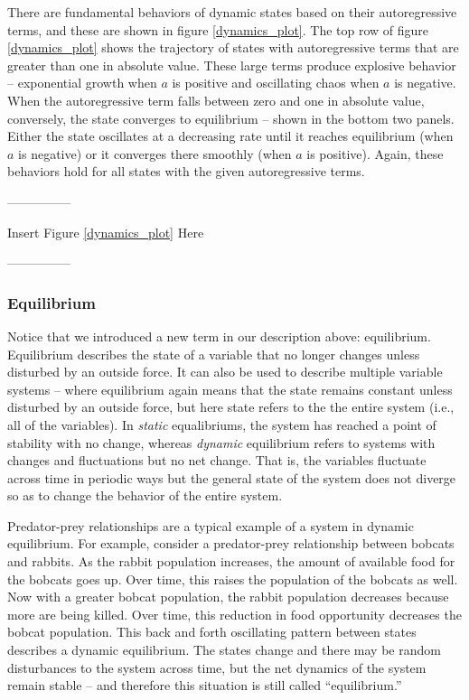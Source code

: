 \documentclass[english,,man]{apa6}
\theoremstyle{definition}
\theoremstyle{definition}
\theoremstyle{definition}
\theoremstyle{remark}
\begin{document}
There are fundamental behaviors of dynamic states based on their
autoregressive terms, and these are shown in figure \ref{dynamics_plot}.
The top row of figure \ref{dynamics_plot} shows the trajectory of states
with autoregressive terms that are greater than one in absolute value.
These large terms produce explosive behavior -- exponential growth when
\(a\) is positive and oscillating chaos when \(a\) is negative. When the
autoregressive term falls between zero and one in absolute value,
conversely, the state converges to equilibrium -- shown in the bottom
two panels. Either the state oscillates at a decreasing rate until it
reaches equilibrium (when \(a\) is negative) or it converges there
smoothly (when \(a\) is positive). Again, these behaviors hold for all
states with the given autoregressive terms.

\begin{center}

---------------

Insert Figure \ref{dynamics_plot} Here

---------------

\end{center}

\hypertarget{equilibrium}{%
\subsubsection{Equilibrium}\label{equilibrium}}

Notice that we introduced a new term in our description above:
equilibrium. Equilibrium describes the state of a variable that no
longer changes unless disturbed by an outside force. It can also be used
to describe multiple variable systems -- where equilibrium again means
that the state remains constant unless disturbed by an outside force,
but here state refers to the the entire system (i.e., all of the
variables). In \emph{static} equalibriums, the system has reached a
point of stability with no change, whereas \emph{dynamic} equilibrium
refers to systems with changes and fluctuations but no net change. That
is, the variables fluctuate across time in periodic ways but the general
state of the system does not diverge so as to change the behavior of the
entire system.

Predator-prey relationships are a typical example of a system in dynamic
equilibrium. For example, consider a predator-prey relationship between
bobcats and rabbits. As the rabbit population increases, the amount of
available food for the bobcats goes up. Over time, this raises the
population of the bobcats as well. Now with a greater bobcat population,
the rabbit population decreases because more are being killed. Over
time, this reduction in food opportunity decreases the bobcat
population. This back and forth oscillating pattern between states
describes a dynamic equilibrium. The states change and there may be
random disturbances to the system across time, but the net dynamics of
the system remain stable -- and therefore this situation is still called
\enquote{equilibrium.}
\end{document}
